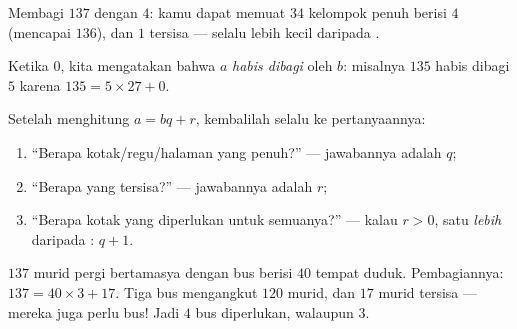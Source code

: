 \begin{omfigure}

{\small Membagi $137$ dengan $4$: kamu dapat memuat $34$ kelompok
penuh berisi $4$ (mencapai $136$), dan $1$ tersisa ---  selalu
lebih kecil daripada .}
\end{omfigure}

\begin{definition}\label{def:g6:wholes:divisible}
Ketika  $0$, kita mengatakan bahwa $a$ \emph{habis
dibagi} oleh $b$: misalnya $135$ habis dibagi $5$
karena $135 = 5 \times 27 + 0$.
\end{definition}

\begin{method}\label{met:g6:wholes:problems}
Setelah menghitung $a = bq + r$, kembalilah selalu ke pertanyaannya:
\begin{enumerate}
  \item ``Berapa kotak/regu/halaman yang penuh?'' --- jawabannya
        adalah  $q$;
  \item ``Berapa yang tersisa?'' --- jawabannya adalah  $r$;
  \item ``Berapa kotak yang diperlukan untuk semuanya?'' --- kalau
        $r > 0$, satu \emph{lebih} daripada : $q + 1$.
\end{enumerate}
\end{method}

\begin{example}\label{ex:g6:wholes:bus}
$137$ murid pergi bertamasya dengan bus berisi $40$ tempat duduk.
Pembagiannya: $137 = 40 \times 3 + 17$. Tiga bus mengangkut $120$
murid, dan $17$ murid tersisa --- mereka juga perlu bus! Jadi $4$ bus
diperlukan, walaupun  $3$.
\end{example}

